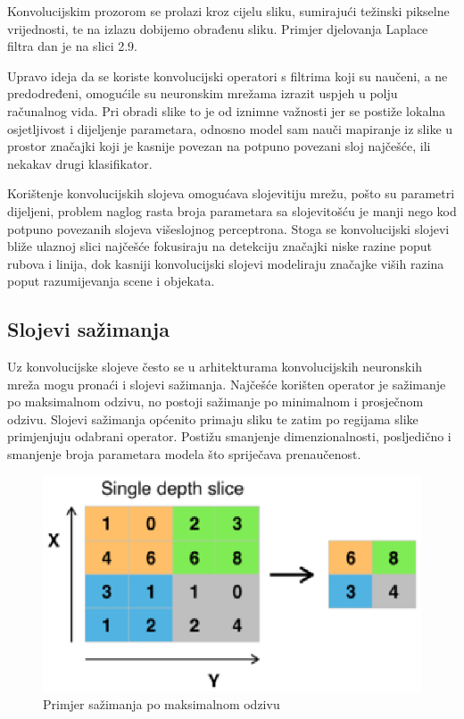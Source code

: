 \documentclass[times, utf8, diplomski]{fer}
\begin{document}
\pagebreak

Konvolucijskim prozorom se prolazi kroz cijelu sliku, sumirajući težinski pikselne vrijednosti, te na izlazu dobijemo obrađenu sliku. Primjer djelovanja Laplace filtra dan je na slici 2.9.\par

Upravo ideja da se koriste konvolucijski operatori s filtrima koji su naučeni, a ne predodređeni, omogućile su neuronskim mrežama izrazit uspjeh u polju računalnog vida. Pri obradi slike to je od iznimne važnosti jer se postiže lokalna osjetljivost i dijeljenje parametara, odnosno model sam nauči mapiranje iz slike u prostor značajki koji je kasnije povezan na potpuno povezani sloj najčešće, ili nekakav drugi klasifikator. \par

Korištenje konvolucijskih slojeva omogućava slojevitiju mrežu, pošto su parametri dijeljeni, problem naglog rasta broja parametara sa slojevitošću je manji nego kod potpuno povezanih slojeva višeslojnog perceptrona. Stoga se konvolucijski slojevi bliže ulaznoj slici najčešće fokusiraju na detekciju značajki niske razine poput rubova i linija, dok kasniji konvolucijski slojevi modeliraju značajke viših razina poput razumijevanja scene i objekata.

\subsection{Slojevi sažimanja}
Uz konvolucijske slojeve često se u arhitekturama konvolucijskih neuronskih mreža mogu pronaći i slojevi sažimanja. Najčešće korišten operator je sažimanje po maksimalnom odzivu, no postoji sažimanje po minimalnom i prosječnom odzivu. Slojevi sažimanja općenito primaju sliku te zatim po regijama slike primjenjuju odabrani operator. Postižu smanjenje dimenzionalnosti, posljedično i smanjenje broja parametara modela što spriječava prenaučenost.

\begin{figure}[htbp]
    \centering
    \includegraphics[scale=1]{Slike/Max_pooling}
    \caption{Primjer sažimanja po maksimalnom odzivu \cite{maxpoolexample}}
\end{figure}
\end{document}

